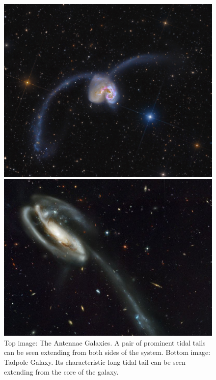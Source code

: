 \documentclass[twoside,twocolumn]{article}
\begin{document}
    \begin{figure}
        \centering
        \includegraphics[width=0.9\linewidth]{images/antennae.png}

        \vspace{0.2cm}
        
        \includegraphics[width=0.9\linewidth]{images/tadpole_tail.png}
        \caption{Top image: The Antennae Galaxies. A pair of prominent tidal tails can be seen extending from both sides of the system. Bottom image: Tadpole Galaxy. Its characteristic long tidal tail can be seen extending from the core of the galaxy.}
        \label{figure:antennae}
        
    \end{figure}
\end{document}
